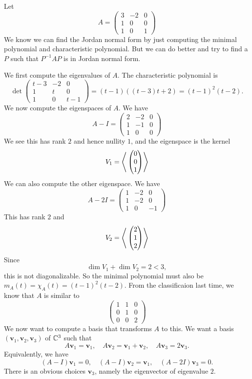 \documentclass[a4paper]{article}
\begin{document}
\begin{example}
	Let
	\[
	  A =
	  \begin{pmatrix}
		3 & -2 & 0\\
		1 & 0 & 0\\
		1 & 0 & 1
	  \end{pmatrix}
	\]
	We know we can find the Jordan normal form by just computing the minimal polynomial and characteristic polynomial. But we can do better and try to find a $P$ such that $P^{-1}AP$ is in Jordan normal form.
  
	We first compute the eigenvalues of $A$. The characteristic polynomial is
	\[
	  \det \begin{pmatrix}
		t - 3 & -2 & 0\\
		1 & t & 0\\
		1 & 0 & t - 1
	  \end{pmatrix} = (t - 1)((t - 3)t + 2) = (t - 1)^2 (t - 2).
	\]
	We now compute the eigenspaces of $A$. We have
	\[
	  A - I =
	  \begin{pmatrix}
		2 & -2 & 0\\
		1 & -1 & 0\\
		1 & 0 & 0
	  \end{pmatrix}
	\]
	We see this has rank $2$ and hence nullity $1$, and the eigenspace is the kernel
	\[
	  V_1 = \left\langle{} 
	  \begin{pmatrix}
		0\\0\\1
	  \end{pmatrix} \right\rangle
	\]
	We can also compute the other eigenspace. We have
	\[
	  A - 2I =
	  \begin{pmatrix}
		1 & -2 & 0\\
		1 & -2 & 0\\
		1 & 0 & -1
	  \end{pmatrix}
	\]
	This has rank $2$ and
	\[
	  V_2 = \left\langle{} 
	  \begin{pmatrix}
		2 \\ 1 \\ 2
	  \end{pmatrix} \right\rangle
	\]
	Since
	\[
	  \dim V_1 + \dim V_2 = 2 < 3,
	\]
	this is not diagonalizable. So the minimal polynomial must also be $m_A(t) = \chi_A(t) = (t - 1)^2 (t - 2)$. From the classificaion last time, we know that $A$ is similar to
	\[
	  \begin{pmatrix}
		1 & 1 & 0\\
		0 & 1 & 0\\
		0 & 0 & 2
	  \end{pmatrix}
	\]
	We now want to compute a basis that transforms $A$ to this. We want a basis $(\mathbf{v}_1, \mathbf{v}_2, \mathbf{v}_3)$ of ${\mathbb{C}}^3$ such that
	\[
	  A\mathbf{v}_1 = \mathbf{v}_1,\quad A\mathbf{v}_2 = \mathbf{v}_1 + \mathbf{v}_2,\quad A \mathbf{v}_3 = 2\mathbf{v}_3.
	\]
	Equivalently, we have
	\[
	  (A - I)\mathbf{v}_1 = 0,\quad (A - I)\mathbf{v}_2 = \mathbf{v}_1, \quad (A - 2I)\mathbf{v}_3 = 0.
	\]
	There is an obvious choices $\mathbf{v}_3$, namely the eigenvector of eigenvalue $2$.
  

\end{example}
\end{document}
